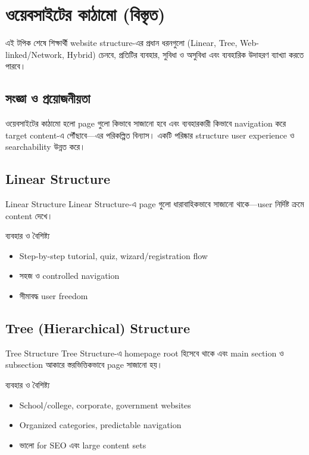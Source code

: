 \section{ওয়েবসাইটের কাঠামো (বিস্তৃত)}

\begin{learningbox}
এই টপিক শেষে শিক্ষার্থী website structure-এর প্রধান ধরনগুলো (Linear, Tree, Web-linked/Network, Hybrid) চেনবে, প্রতিটির ব্যবহার, সুবিধা ও অসুবিধা এবং ব্যবহারিক উদাহরণ ব্যাখ্যা করতে পারবে।
\end{learningbox}

\subsection{সংজ্ঞা ও প্রয়োজনীয়তা}
ওয়েবসাইটের কাঠামো হলো page গুলো কিভাবে সাজানো হবে এবং ব্যবহারকারী কিভাবে navigation করে target content-এ পৌঁছাবে—এর পরিকল্পিত বিন্যাস। একটি পরিষ্কার structure user experience ও searchability উন্নত করে।

\subsection{Linear Structure}
\begin{definitionbox}{Linear Structure}
Linear Structure-এ page গুলো ধারাবাহিকভাবে সাজানো থাকে—user নির্দিষ্ট ক্রমে content দেখে।\end{definitionbox}

\begin{keypointbox}{ব্যবহার ও বৈশিষ্ট্য}
\begin{itemize}
\item Step-by-step tutorial, quiz, wizard/registration flow
\item সহজ ও controlled navigation
\item সীমাবদ্ধ user freedom
\end{itemize}
\end{keypointbox}

\subsection{Tree (Hierarchical) Structure}
\begin{definitionbox}{Tree Structure}
Tree Structure-এ homepage root হিসেবে থাকে এবং main section ও subsection আকারে স্তরভিত্তিকভাবে page সাজানো হয়।\end{definitionbox}

\begin{keypointbox}{ব্যবহার ও বৈশিষ্ট্য}
\begin{itemize}
\item School/college, corporate, government websites
\item Organized categories, predictable navigation
\item ভালো for SEO এবং large content sets
\end{itemize}
\end{keypointbox}

